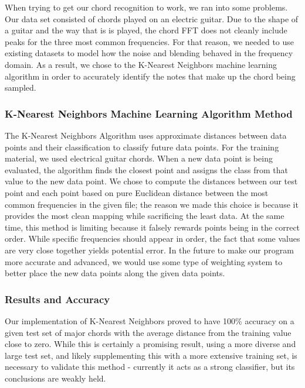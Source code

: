 \documentclass{article}
\begin{document}
When trying to get our chord recognition to work, we ran into some problems. Our data set consisted of chords played on an electric guitar. Due to the shape of a guitar and the way that is is played, the chord FFT does not cleanly include peaks for the three most common frequencies. For that reason, we needed to use existing datasets to model how the noise and blending behaved in the frequency domain. As a result, we chose to the K-Nearest Neighbors machine learning algorithm in order to accurately identify the notes that make up the chord being sampled.

\subsubsection{K-Nearest Neighbors Machine Learning Algorithm Method}

The K-Nearest Neighbors Algorithm uses approximate distances between data points and their classification to classify future data points. For the training material, we used electrical guitar chords. When a new data point is being evaluated, the algorithm finds the closest point and assigns the class from that value to the new data point. We chose to compute the distances between our test point and each point based on pure Euclidean distance between the most common frequencies in the given file; the reason we made this choice is because it provides the most clean mapping while sacrificing the least data. At the same time, this method is limiting because it falsely rewards points being in the correct order. While specific frequencies should appear in order, the fact that some values are very close together yields potential error. In the future to make our program more accurate and advanced, we would use some type of weighting system to better place the new data points along the given data points.

\subsubsection{Results and Accuracy}
Our implementation of K-Nearest Neighbors proved to have 100\% accuracy on a given test set of major chords with the average distance from the training value close to zero. While this is certainly a promising result, using a more diverse and large test set, and likely supplementing this with a more extensive training set, is necessary to validate this method - currently it acts as a strong classifier, but its conclusions are weakly held.
\end{document}
